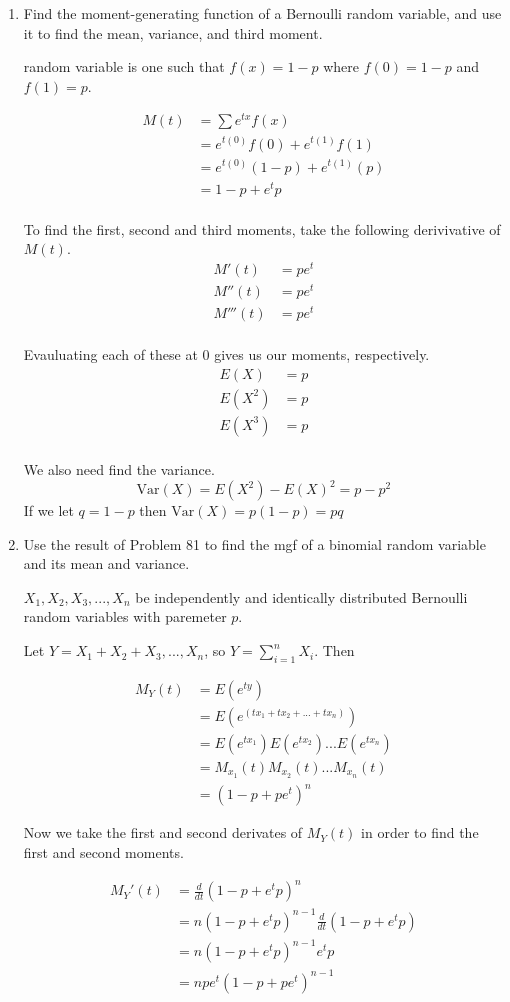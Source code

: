 \documentclass{tufte-book}
\newcommand{\Var}{\mathrm{Var}}
\theoremstyle{mytheoremstyle}
\theoremstyle{mylemstyle}
\theoremstyle{mydefstyle}
\begin{document}
\begin{enumerate}

\item Find the moment-generating function of a Bernoulli random variable, and use it to find the mean, variance, and third moment.

 random variable is one such that $f(x) = 1-p$ where $f(0) = 1-p$ and $f(1) = p$.

\begin{align*}
M(t) &= \sum e^{tx} f(x)\\
&= e^{t(0)}f(0) + e^{t(1)}f(1)\\
&= e^{t(0)}(1-p) + e^{t(1)}(p)\\
&= 1-p + e^tp\\
\end{align*}

To find the first, second and third moments, take the following derivivative of $M(t)$.
\begin{align*}
M'(t) &= pe^{t}\\
M''(t) &= pe^{t}\\
M'''(t) &= pe^{t}\\
\end{align*}

Evauluating each of these at $0$ gives us our moments, respectively.
\begin{align*}
E(X) &= p \\
E(X^2) &= p\\
E(X^3) &= p\\
\end{align*}

We also need find the variance.
\[ \Var(X) = E(X^2) - E(X)^2 = p - p^2 \]
If we let $q = 1-p$ then $\Var(X) = p(1-p) = pq$

\item Use the result of Problem 81 to find the mgf of a binomial random variable and its mean and variance.

 $X_1, X_2, X_3,...,X_n$ be independently and identically distributed Bernoulli random variables with paremeter $p$.

Let $Y=X_1+X_2+X_3,...,X_n$, so $Y=\sum_{i=1}^nX_i$.  Then

\begin{align*}
M_Y(t) &= E(e^{ty})\\
&= E(e^{(tx_1 + tx_2+...+tx_n)})\\
&= E(e^{tx_1})E(e^{tx_2})...E(e^{tx_n})\\
&= M_{x_1}(t)M_{x_2}(t)...M_{x_n}(t)\\
&= (1-p + pe^t)^n
\end{align*}

Now we take the first and second derivates of $M_Y(t)$ in order to find the first and second moments.

\begin{align*}
M_Y'(t) &= \frac{d}{dt}(1-p+e^tp)^n\\
&= n(1-p+e^tp)^{n-1} \frac{d}{dt}(1-p+e^tp)\\
&= n(1-p+e^tp)^{n-1} e^{t}p\\
&= npe^t(1-p+pe^t)^{n-1}\\
\end{align*}

\end{enumerate}
\end{document}
